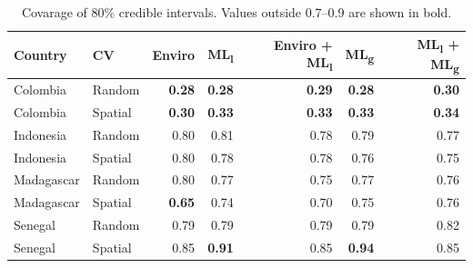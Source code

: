 \documentclass[review]{elsarticle}
\begin{document}
\begin{table}[t!]
\caption{Covarage of 80\% credible intervals. Values outside 0.7--0.9 are shown in bold.}
\centering
\begin{tabular}{llrrrrr}
Country &  CV & Enviro & ML\textsubscript{l} &  Enviro + ML\textsubscript{l} & ML\textsubscript{g} & ML\textsubscript{l} + ML\textsubscript{g} \\
\hline 
 Colombia & Random & \textbf{0.28} & \textbf{0.28} & \textbf{0.29} & \textbf{0.28} & \textbf{0.30} \\
 Colombia &  Spatial & \textbf{0.30} & \textbf{0.33}  & \textbf{0.33} & \textbf{0.33} & \textbf{0.34}  \\
 Indonesia & Random &0.80 & 0.81& 0.78& 0.79& 0.77  \\
 Indonesia & Spatial & 0.80 & 0.78& 0.78& 0.76& 0.75  \\
 Madagascar &  Random & 0.80 & 0.77& 0.75& 0.77& 0.76 \\
 Madagascar & Spatial & \textbf{0.65} & 0.74& 0.70& 0.75 & 0.76   \\
 Senegal & Random &0.79 & 0.79& 0.79& 0.79& 0.82 \\
 Senegal & Spatial & 0.85 & \textbf{0.91}& 0.85& \textbf{0.94} & 0.85  \\
\end{tabular}
\label{t:coverage}
\end{table}
\end{document}
